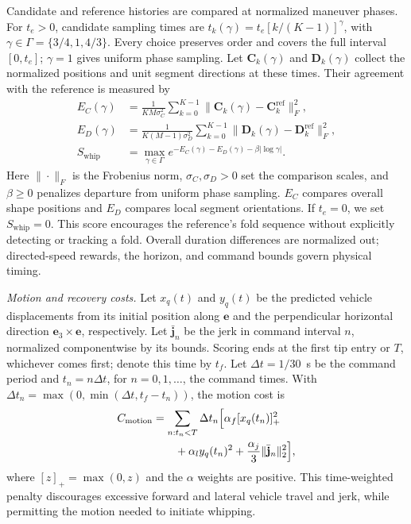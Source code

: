 \documentclass[letterpaper, 10 pt, conference]{ieeeconf}
\begin{document}
Candidate and reference histories are compared at normalized
maneuver phases. For $t_e>0$, candidate sampling times are
$t_k(\gamma)=t_e[k/(K-1)]^\gamma$, with
$\gamma\in\Gamma=\{3/4,1,4/3\}$.
Every choice preserves order and covers the full interval $[0,t_e]$;
$\gamma=1$ gives uniform phase sampling. Let $\mathbf{C}_k(\gamma)$
and $\mathbf{D}_k(\gamma)$ collect the normalized positions and unit
segment directions at these times. Their agreement with the
reference is measured by
\begin{equation}
\begin{aligned}
E_C(\gamma)
&=\frac{1}{KM\sigma_C^2}
\sum_{k=0}^{K-1}
\|\mathbf{C}_k(\gamma)-\mathbf{C}_k^{\mathrm{ref}}\|_F^2,\\
E_D(\gamma)
&=\frac{1}{K(M-1)\sigma_D^2}
\sum_{k=0}^{K-1}
\|\mathbf{D}_k(\gamma)-\mathbf{D}_k^{\mathrm{ref}}\|_F^2,\\
S_{\mathrm{whip}}
&=\max_{\gamma\in\Gamma}
e^{-E_C(\gamma)-E_D(\gamma)-\beta|\log\gamma|}.
\end{aligned}
\label{eq:whip_similarity}
\end{equation}
Here $\|\cdot\|_F$ is the Frobenius norm,
$\sigma_C,\sigma_D>0$ set the comparison scales, and
$\beta\geq0$ penalizes departure from uniform phase sampling.
$E_C$ compares overall shape positions and $E_D$ compares
local segment orientations. If $t_e=0$, we set $S_{\mathrm{whip}}=0$.
This score encourages the reference's
fold sequence without explicitly detecting or tracking a fold.
Overall duration differences are normalized out; directed-speed
rewards, the horizon, and command bounds govern physical timing.

\noindent\emph{Motion and recovery costs.}
Let $x_q(t)$ and $y_q(t)$ be the predicted vehicle displacements
from its initial position along $\mathbf e$ and the perpendicular
horizontal direction $\mathbf e_3\times\mathbf e$, respectively.
Let $\bar{\mathbf j}_n$ be the jerk in command interval $n$,
normalized componentwise by its bounds.
Scoring ends at the first tip entry or $T$, whichever comes first;
denote this time by $t_f$. Let $\Delta t=1/30$~s be the command
period and $t_n=n\Delta t$, for $n=0,1,\ldots$, the command times.
With $\Delta t_n=\max(0,\min(\Delta t,t_f-t_n))$,
the motion cost is
\begin{equation}
\begin{aligned}
C_{\mathrm{motion}}
&=\sum_{n:t_n<T}\Delta t_n\Bigl[\alpha_f[x_q(t_n)]_+^2\\
&\qquad+\alpha_l y_q(t_n)^2
  +\frac{\alpha_j}{3}\|\bar{\mathbf j}_n\|_2^2\Bigr],
\end{aligned}
\label{eq:motion_cost}
\end{equation}
where $[z]_+=\max(0,z)$ and the $\alpha$ weights are positive.
This time-weighted penalty discourages excessive forward and
lateral vehicle travel and jerk, while permitting the motion
needed to initiate whipping.
\end{document}
